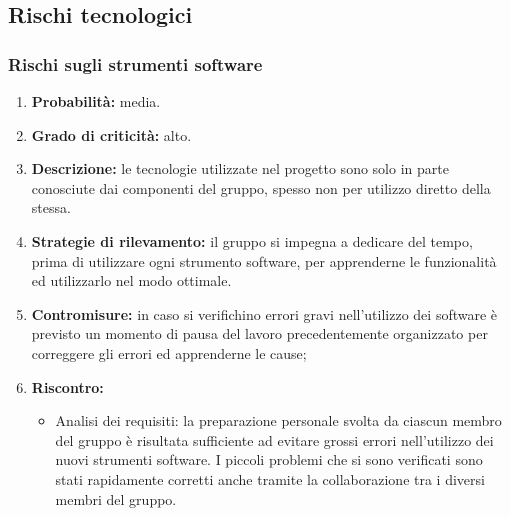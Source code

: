 \subsection{Rischi tecnologici}
\subsubsection{Rischi sugli strumenti software}
\begin{enumerate}
	\item \textbf{Probabilità:} media.
	\item \textbf{Grado di criticità:} alto.
	\item \textbf{Descrizione:} le tecnologie utilizzate nel progetto sono solo in parte conosciute dai componenti del gruppo, spesso non per utilizzo diretto della stessa.
	\item \textbf{Strategie di rilevamento:} il gruppo si impegna a dedicare del tempo, prima di utilizzare ogni strumento software, per apprenderne le funzionalità ed utilizzarlo nel modo ottimale.
	\item \textbf{Contromisure:} in caso si verifichino errori gravi nell'utilizzo dei software è previsto un momento di pausa del lavoro precedentemente organizzato per correggere gli errori ed apprenderne le cause;
	\item \textbf{Riscontro:} 
	\begin{itemize}
		\item Analisi dei requisiti: la preparazione personale svolta da ciascun membro del gruppo è risultata sufficiente ad evitare grossi errori nell'utilizzo dei nuovi strumenti software. I piccoli problemi che si sono verificati sono stati rapidamente corretti anche tramite la collaborazione tra i diversi membri del gruppo.
	\end{itemize}
\end{enumerate}

